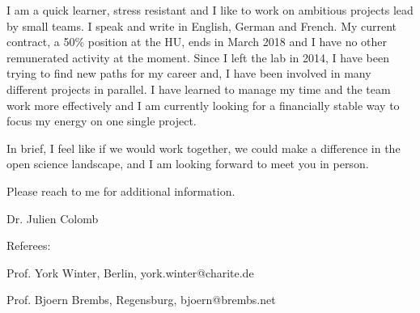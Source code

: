 
I am  a quick learner, stress resistant and I like to work on ambitious projects lead by small teams. I speak and write in English, German and French. My current contract, a 50\% position at the HU, ends in March 2018 and I have no other remunerated activity at the moment. 
Since I left the lab in 2014, I have been trying to find new paths for my career and,
 I have been involved in many different projects in parallel. I have learned to manage my time and the team work more effectively and I am currently looking for a financially stable way to focus my energy on one single project. 

In brief, I feel like if we would work together, we could make a difference in the open science landscape,
and I am looking forward to meet you in person.

Please reach to me for additional information.

Dr. Julien Colomb


\vspace {1.5cm} 

Referees:

Prof. York Winter, Berlin, york.winter@charite.de
 
 
Prof. Bjoern Brembs, Regensburg, bjoern@brembs.net
